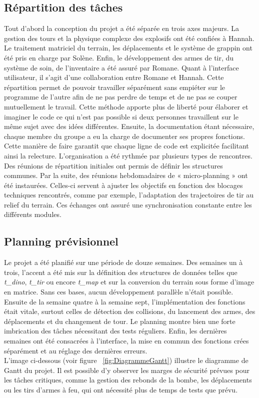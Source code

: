 \documentclass[11pt,a4paper]{article}
\begin{document}
\subsection{Répartition des tâches}

Tout d’abord la conception du projet a été séparée en trois axes majeurs. La gestion des tours et la physique complexe des explosifs ont été confiées à Hannah. Le traitement matriciel du terrain, les déplacements et le système de grappin ont été pris en charge par Solène. Enfin, le développement des armes de tir, du système de soin, de l'inventaire a été assuré par Romane. Quant à l'interface utilisateur, il s'agit d'une collaboration entre Romane et Hannah. Cette répartition permet de pouvoir travailler séparément sans empiéter sur le programme de l’autre afin de ne pas perdre de temps et de ne pas se couper mutuellement le travail. Cette méthode apporte plus de liberté pour élaborer et imaginer le code ce qui n'est pas possible si deux personnes travaillent sur le même sujet avec des idées différentes.
Ensuite, la documentation étant nécessaire, chaque membre du groupe a eu la charge de documenter ses propres fonctions. Cette manière de faire garantit que chaque ligne de code est explicitée facilitant ainsi la relecture. L'organisation a été rythmée par plusieurs types de rencontres. Des réunions de répartition initiales ont permis de définir les structures communes. Par la suite, des réunions hebdomadaires de « micro-planning » ont été instaurées. Celles-ci servent à ajuster les objectifs en fonction des blocages techniques rencontrés, comme par exemple, l'adaptation des trajectoires de tir au relief du terrain. Ces échanges ont assuré une synchronisation constante entre les différents modules. 

\subsection{Planning prévisionnel}

Le projet a été planifié sur une période de douze semaines.
Des semaines un à trois, l’accent a été mis sur la définition des structures de données telles que \textit{\mbox{t\_dino}}, \textit{\mbox{t\_tir}} ou encore  \textit{\mbox{t\_map}} et sur la conversion du terrain sous forme d'image en matrice. Sans ces bases, aucun développement parallèle n’était possible. Ensuite de la semaine quatre à la semaine sept, l’implémentation des fonctions était vitale, surtout celles de détection des collisions, du lancement des armes, des déplacements et du changement de tour. Le planning montre bien une forte imbrication des tâches nécessitant des tests réguliers. Enfin, les dernières semaines ont été consacrées à l’interface, la mise en commun des fonctions crées séparément et au réglage des dernières erreurs.
\\
L’image ci-dessous (voir figure ~\ref{fig:DiagrammeGantt}) illustre le diagramme de Gantt du projet. Il est possible d'y observer les marges de sécurité prévues pour les tâches critiques, comme la gestion des rebonds de la bombe, les déplacements ou les tirs d’armes à feu, qui ont nécessité plus de temps de tests que prévu. 
\end{document}

